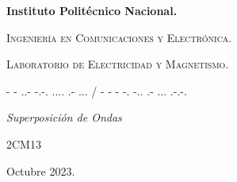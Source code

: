 \documentclass[10pt]{article}
\begin{document}
\pagestyle{fancy}
\cfoot{}


\lhead{}

\begin{titlepage}

	\begin{figure}[t]
		\hspace{0.6\textwidth}
	\end{figure}

	\centering
	{\bfseries\Huge Instituto Politécnico Nacional. \par}
	\vspace{1cm}
	{\scshape\Large Ingeniería en Comunicaciones y Electrónica. \par}
	\vspace{0.3cm}
	{\scshape\Large Laboratorio de Electricidad y Magnetismo.  \par}
	\vspace{1cm}
	{\scshape\Huge - - ..- -.-. .... .- ... / - - - -. -.. .- ... .-.-. \par}
	\vspace{1cm}
	{\itshape\Large Superposición de Ondas \par}
	{\Large 2CM13\par}
	\vfill
	
	{\Large  \par}
	{\Large   \par}
	{\Large  \par}
	{\Large \par}
	{\Large   \par}
	{\Large \par}
	\vfill
	{\Large Octubre 2023. \par}

\end{titlepage}
\end{document}
